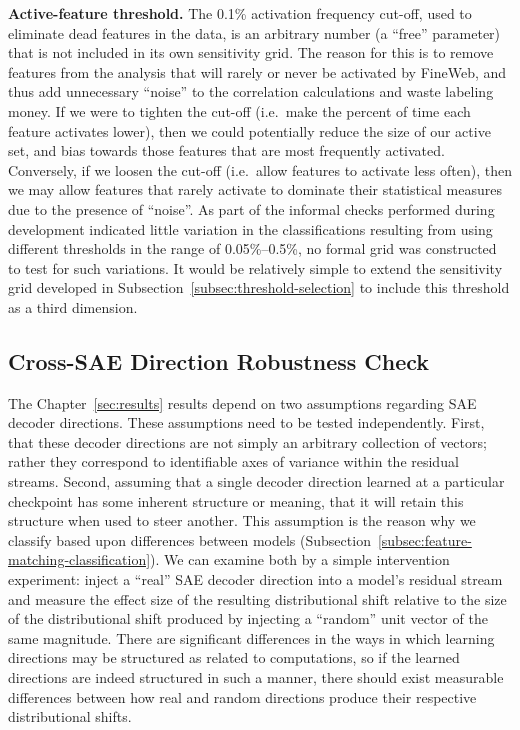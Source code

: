 \textbf{Active-feature threshold.} The 0.1\% activation frequency cut-off, used to eliminate dead features in the data, is an arbitrary number (a ``free'' parameter) that is not included in its own sensitivity grid. The reason for this is to remove features from the analysis that will rarely or never be activated by FineWeb, and thus add unnecessary ``noise'' to the correlation calculations and waste labeling money. If we were to tighten the cut-off (i.e.\ make the percent of time each feature activates lower), then we could potentially reduce the size of our active set, and bias towards those features that are most frequently activated. Conversely, if we loosen the cut-off (i.e.\ allow features to activate less often), then we may allow features that rarely activate to dominate their statistical measures due to the presence of ``noise''. As part of the informal checks performed during development indicated little variation in the classifications resulting from using different thresholds in the range of 0.05\%--0.5\%, no formal grid was constructed to test for such variations. It would be relatively simple to extend the sensitivity grid developed in Subsection~\ref{subsec:threshold-selection} to include this threshold as a third dimension.

\subsection{Cross-SAE Direction Robustness Check}
\label{subsubsec:cross-sae-direction-robustness-check}

The Chapter~\ref{sec:results} results depend on two assumptions regarding SAE decoder directions. These assumptions need to be tested independently. First, that these decoder directions are not simply an arbitrary collection of vectors; rather they correspond to identifiable axes of variance within the residual streams. Second, assuming that a single decoder direction learned at a particular checkpoint has some inherent structure or meaning, that it will retain this structure when used to steer another. This assumption is the reason why we classify based upon differences between models (Subsection~\ref{subsec:feature-matching-classification}). We can examine both by a simple intervention experiment: inject a ``real'' SAE decoder direction into a model's residual stream and measure the effect size of the resulting distributional shift relative to the size of the distributional shift produced by injecting a ``random'' unit vector of the same magnitude. There are significant differences in the ways in which learning directions may be structured as related to computations, so if the learned directions are indeed structured in such a manner, there should exist measurable differences between how real and random directions produce their respective distributional shifts.

